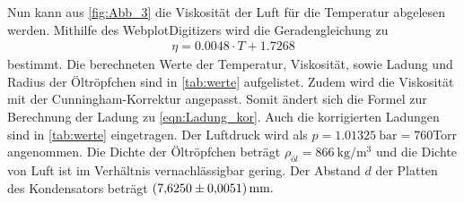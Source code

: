 Nun kann aus \autoref{fig:Abb_3} die Viskosität der Luft für die Temperatur abgelesen werden.
Mithilfe des WebplotDigitizers \cite{Rohatgi2020} wird die Geradengleichung zu
\begin{align*}
       \eta = 0.0048 \cdot T + 1.7268 
\end{align*}
bestimmt.
Die berechneten Werte der Temperatur, Viskosität, sowie Ladung und Radius der Öltröpfchen sind in \autoref{tab:werte} aufgelistet.
Zudem wird die Viskosität mit der Cunningham-Korrektur angepasst. Somit ändert sich die Formel zur Berechnung der Ladung zu \autoref{eqn:Ladung_kor}.
Auch die korrigierten Ladungen sind in \autoref{tab:werte} eingetragen.
Der Luftdruck wird als $p= \qty{1.01325}{\bar} = 760$Torr angenommen.
Die Dichte der Öltröpfchen beträgt $\rho_{öl}= \qty{866}{\kilo\gram\per\cubic\meter}$\cite{V503} und die Dichte von Luft ist im Verhältnis vernachlässigbar gering.
Der Abstand $d$ der Platten des Kondensators beträgt $\qty{7.6250 \pm 0.0051}{\milli\meter}.$\cite{V503}
